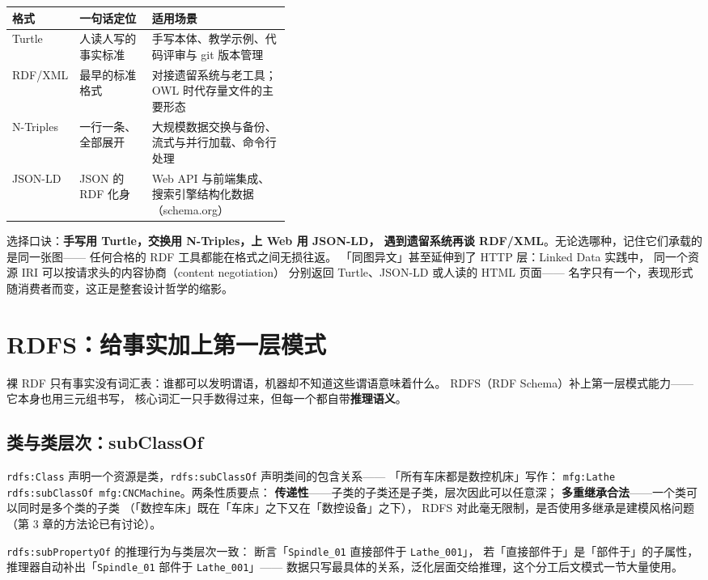 \begin{center}
\small
\begin{tabularx}{\linewidth}{@{}>{\ttfamily}p{0.14\linewidth}p{0.26\linewidth}X@{}}
\toprule
\normalfont\textbf{格式} & \textbf{一句话定位} & \textbf{适用场景} \\
\midrule
Turtle & 人读人写的事实标准 & 手写本体、教学示例、代码评审与 git 版本管理 \\
RDF/XML & 最早的标准格式 & 对接遗留系统与老工具；OWL 时代存量文件的主要形态 \\
N-Triples & 一行一条、全部展开 & 大规模数据交换与备份、流式与并行加载、命令行处理 \\
JSON-LD & JSON 的 RDF 化身 & Web API 与前端集成、搜索引擎结构化数据（schema.org） \\
\bottomrule
\end{tabularx}
\end{center}

选择口诀：\textbf{手写用 Turtle，交换用 N-Triples，上 Web 用 JSON-LD，
遇到遗留系统再谈 RDF/XML}。无论选哪种，记住它们承载的是同一张图——
任何合格的 RDF 工具都能在格式之间无损往返。
「同图异文」甚至延伸到了 HTTP 层：Linked Data 实践中，
同一个资源 IRI 可以按请求头的内容协商（content negotiation）
分别返回 Turtle、JSON-LD 或人读的 HTML 页面——
名字只有一个，表现形式随消费者而变，这正是整套设计哲学的缩影。

\section{RDFS：给事实加上第一层模式}

裸 RDF 只有事实没有词汇表：谁都可以发明谓语，机器却不知道这些谓语意味着什么。
RDFS（RDF Schema）补上第一层模式能力——它本身也用三元组书写，
核心词汇一只手数得过来，但每一个都自带\textbf{推理语义}。

\subsection{类与类层次：subClassOf}

\texttt{rdfs:Class} 声明一个资源是类，\texttt{rdfs:subClassOf} 声明类间的包含关系——
「所有车床都是数控机床」写作：
\texttt{mfg:Lathe rdfs:subClassOf mfg:CNCMachine}。两条性质要点：
\textbf{传递性}——子类的子类还是子类，层次因此可以任意深；
\textbf{多重继承合法}——一个类可以同时是多个类的子类
（「数控车床」既在「车床」之下又在「数控设备」之下），
RDFS 对此毫无限制，是否使用多继承是建模风格问题（第 3 章的方法论已有讨论）。

\texttt{rdfs:subPropertyOf} 的推理行为与类层次一致：
断言「\texttt{Spindle\_01} 直接部件于 \texttt{Lathe\_001}」，
若「直接部件于」是「部件于」的子属性，
推理器自动补出「\texttt{Spindle\_01} 部件于 \texttt{Lathe\_001}」——
数据只写最具体的关系，泛化层面交给推理，这个分工后文模式一节大量使用。

